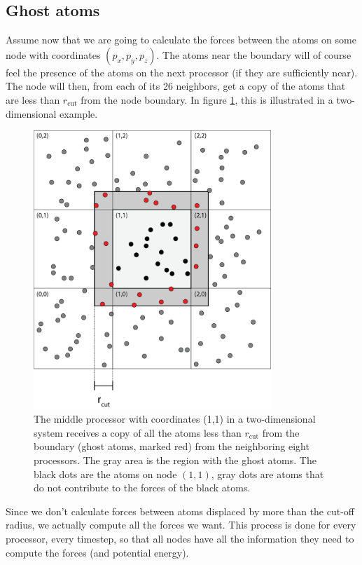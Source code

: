 \subsection{Ghost atoms}
Assume now that we are going to calculate the forces between the atoms on some node with coordinates $(p_x, p_y, p_z)$. The atoms near the boundary will of course feel the presence of the atoms on the next processor (if they are sufficiently near). The node will then, from each of its 26 neighbors, get a copy of the atoms that are less than $r_\text{cut}$ from the node boundary. In figure \ref{fig:md_ghost_atoms}, this is illustrated in a two-dimensional example.
\begin{figure}[h]
\begin{center}
\includegraphics[width=0.8\textwidth, trim=0cm 0cm 0cm 0cm, clip]{MD/figures/parallelization_ghost_atoms.eps}
\end{center}
\caption{The middle processor with coordinates (1,1) in a two-dimensional system receives a copy of all the atoms less than $r_\text{cut}$ from the boundary (ghost atoms, marked red) from the neighboring eight processors. The gray area is the region with the ghost atoms. The black dots are the atoms on node $(1,1)$, gray dots are atoms that do not contribute to the forces of the black atoms.}
\label{fig:md_ghost_atoms}
\end{figure}
Since we don't calculate forces between atoms displaced by more than the cut-off radius, we actually compute all the forces we want. This process is done for every processor, every timestep, so that all nodes have all the information they need to compute the forces (and potential energy).
